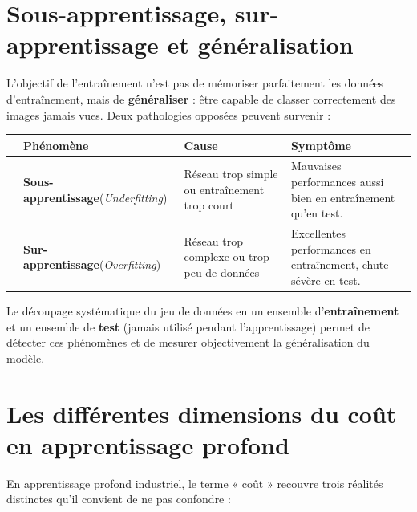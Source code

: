 \documentclass[11pt,a4paper,openany]{book}
\newcommand{\tableheadcolor}{\rowcolor{headerbg}}
\newcommand{\tablerowodd}{}
\begin{document}
\section{Sous-apprentissage, sur-apprentissage et généralisation}

L'objectif de l'entraînement n'est pas de mémoriser parfaitement les données d'entraînement, mais de \textbf{généraliser} : être capable de classer correctement des images jamais vues. Deux pathologies opposées peuvent survenir :

\vspace{0.8em}
\begin{tabularx}{\linewidth}{C{0.5cm} L{3.3cm} L{5.5cm} L{6.6cm}}
  \toprule
  \tableheadcolor
  & \textbf{Phénomène} & \textbf{Cause} & \textbf{Symptôme} \\
  \midrule
  \tablerowodd
  & \textbf{Sous-apprentissage}\newline(\textit{Underfitting}) & Réseau trop simple ou entraînement trop court & Mauvaises performances aussi bien en entraînement qu'en test. \\
  & \textbf{Sur-apprentissage}\newline(\textit{Overfitting}) & Réseau trop complexe ou trop peu de données & Excellentes performances en entraînement, chute sévère en test. \\
  \bottomrule
\end{tabularx}

\vspace{0.5em}
Le découpage systématique du jeu de données en un ensemble d'\textbf{entraînement} et un ensemble de \textbf{test} (jamais utilisé pendant l'apprentissage) permet de détecter ces phénomènes et de mesurer objectivement la généralisation du modèle.

\section{Les différentes dimensions du coût en apprentissage profond}

En apprentissage profond industriel, le terme « coût » recouvre trois réalités distinctes qu'il convient de ne pas confondre :
\end{document}
